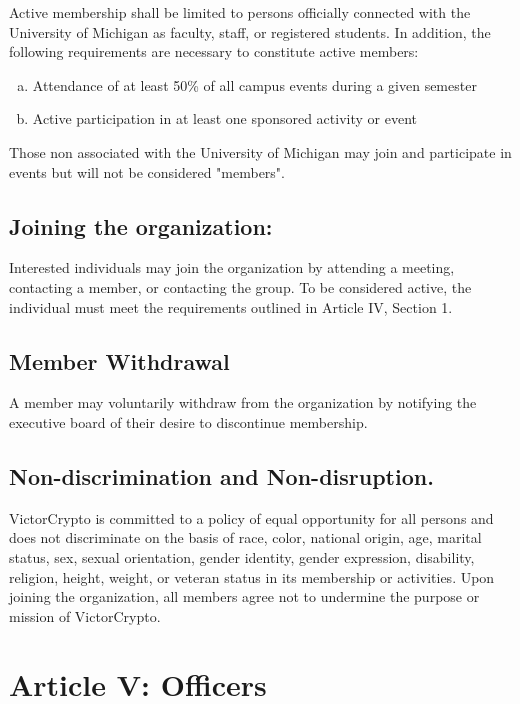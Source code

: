 \documentclass[11pt]{article}
\begin{document}
    Active membership shall be limited to persons officially connected with the University of Michigan as faculty, staff, or registered students.
    In addition, the following requirements are necessary to constitute active members:

    \begin{enumerate}
        [a)]
        \item Attendance of at least 50\% of all campus events during a given semester
        \item Active participation in at least one sponsored activity or event
    \end{enumerate}

    Those non associated with the University of Michigan may join and participate in events but will not be considered "members".

    \subsection{Joining the organization:}

    Interested individuals may join the organization by attending a meeting, contacting a member, or contacting the
    group.
    To be considered active, the individual must meet the requirements outlined in Article IV, Section 1.

    \subsection{Member Withdrawal}

    A member may voluntarily withdraw from the organization by notifying the executive board of their desire to discontinue membership.

    \subsection{Non-discrimination and Non-disruption. }

    VictorCrypto is committed to a policy of equal opportunity for all persons and does not discriminate on the basis of race, color, national origin, age, marital status, sex, sexual orientation, gender identity, gender expression, disability, religion, height, weight, or veteran status in its membership or activities.
    Upon joining the organization, all members agree not to undermine the purpose or mission of VictorCrypto.


    \section{Article V: Officers}
\end{document}
